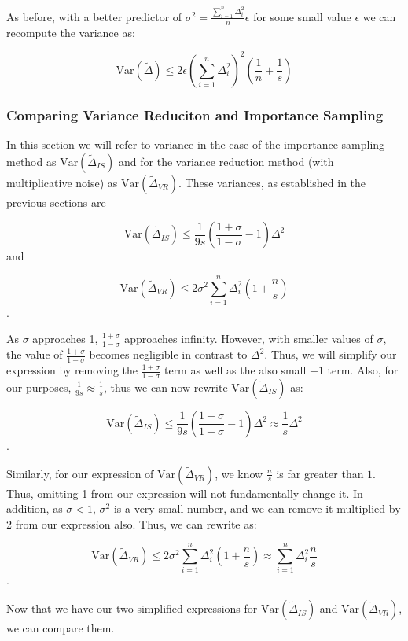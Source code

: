 \documentclass[11pt]{article}
\begin{document}
As before, with a better predictor of $\sigma^2 = \frac{\sum_{i = 1}^{n}\Delta_i^2}{n} \epsilon$ for some small value $\epsilon$ we can recompute the variance as:

\[
\mathrm{Var}(\tilde{\Delta}) \leq 2\epsilon(\sum_{i = 1}^{n}\Delta_i^2)^2(\frac{1}{n} + \frac{1}{s})
\]

\subsubsection{Comparing Variance Reduciton and Importance Sampling}

In this section we will refer to variance in the case of the importance sampling method as $\mathrm{Var}(\tilde{\Delta}_{IS})$ and for the variance reduction method (with multiplicative noise) as $\mathrm{Var}(\tilde{\Delta}_{VR})$.
These variances, as established in the previous sections are

\[
\mathrm{Var}(\tilde{\Delta}_{IS}) \leq \frac{1}{9s} (\frac{1 + \sigma}{1 - \sigma} - 1) \Delta^2
\] and

\[
\mathrm{Var}(\tilde{\Delta}_{VR}) \leq 2\sigma^2\sum_{i = 1}^{n} \Delta_i^2(1 + \frac{n}{s})
\].

As $\sigma$ approaches 1, $\frac{1 + \sigma}{1 - \sigma}$ approaches infinity.
However, with smaller values of $\sigma$, the value of $\frac{1 + \sigma}{1 - \sigma}$ becomes negligible in contrast to $\Delta^2$.
Thus, we will simplify our expression by removing the $\frac{1 + \sigma}{1 - \sigma}$ term as well as the also small $-1$ term.
Also, for our purposes, $\frac{1}{9s} \approx \frac{1}{s}$, thus we can now rewrite $\mathrm{Var}(\tilde{\Delta}_{IS})$ as:

\[
\mathrm{Var}(\tilde{\Delta}_{IS}) \leq \frac{1}{9s} (\frac{1 + \sigma}{1 - \sigma} - 1) \Delta^2 \approx \frac{1}{s} \Delta^2
\].

Similarly, for our expression of $\mathrm{Var}(\tilde{\Delta}_{VR})$, we know $\frac{n}{s}$ is far greater than $1$.
Thus, omitting 1 from our expression will not fundamentally change it.
In addition, as $\sigma < 1$, $\sigma^2$ is a very small number, and we can remove it multiplied by 2 from our expression also.
Thus, we can rewrite as:

\[
\mathrm{Var}(\tilde{\Delta}_{VR}) \leq 2\sigma^2\sum_{i = 1}^{n} \Delta_i^2(1 + \frac{n}{s}) \approx \sum_{i = 1}^{n} \Delta_i^2\frac{n}{s}
\].

Now that we have our two simplified expressions for $\mathrm{Var}(\tilde{\Delta}_{IS})$ and $\mathrm{Var}(\tilde{\Delta}_{VR})$, we can compare them.
\end{document}

